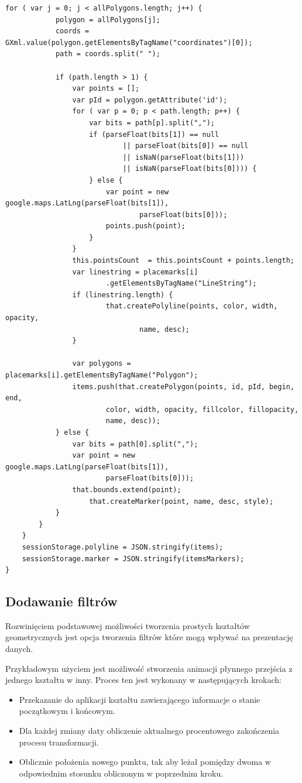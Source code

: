 \begin{lstlisting}[label={lst:minconf},caption={Parser plików.}]
		for ( var j = 0; j < allPolygons.length; j++) {
			polygon = allPolygons[j];
			coords = GXml.value(polygon.getElementsByTagName("coordinates")[0]);
			path = coords.split(" ");

			if (path.length > 1) {
				var points = [];
				var pId = polygon.getAttribute('id');
				for ( var p = 0; p < path.length; p++) {
					var bits = path[p].split(",");
					if (parseFloat(bits[1]) == null
							|| parseFloat(bits[0]) == null
							|| isNaN(parseFloat(bits[1]))
							|| isNaN(parseFloat(bits[0]))) {
					} else {
						var point = new google.maps.LatLng(parseFloat(bits[1]),
								parseFloat(bits[0]));
						points.push(point);
					}
				}
				this.pointsCount  = this.pointsCount + points.length;
				var linestring = placemarks[i]
						.getElementsByTagName("LineString");
				if (linestring.length) {
						that.createPolyline(points, color, width, opacity,
								name, desc);
				}

				var polygons = placemarks[i].getElementsByTagName("Polygon");
				items.push(that.createPolygon(points, id, pId, begin, end,
						color, width, opacity, fillcolor, fillopacity,
						name, desc));
			} else {
				var bits = path[0].split(",");
				var point = new google.maps.LatLng(parseFloat(bits[1]),
						parseFloat(bits[0]));
				that.bounds.extend(point);
					that.createMarker(point, name, desc, style);
			}
		}
	}
	sessionStorage.polyline = JSON.stringify(items);
	sessionStorage.marker = JSON.stringify(itemsMarkers);
}

\end{lstlisting}

\subsection{Dodawanie filtrów}
\label{subsec:filters}

Rozwinięciem podstawowej możliwości tworzenia prostych kształtów geometrycznych jest opcja tworzenia filtrów które mogą wpływać na prezentację danych.

Przykładowym użyciem jest możliwość stworzenia animacji płynnego przejścia z jednego kształtu w inny. Proces ten jest wykonany w następujących krokach:

\begin{itemize}
\item
Przekazanie do aplikacji kształtu zawierającego informacje o stanie początkowym i końcowym.
\item
Dla każdej zmiany daty obliczenie aktualnego procentowego zakończenia procesu transformacji.
\item
Oblicznie położenia nowego punktu, tak aby leżał pomiędzy dwoma w odpowiednim stosunku obliczonym w poprzednim kroku.
\end{itemize}

